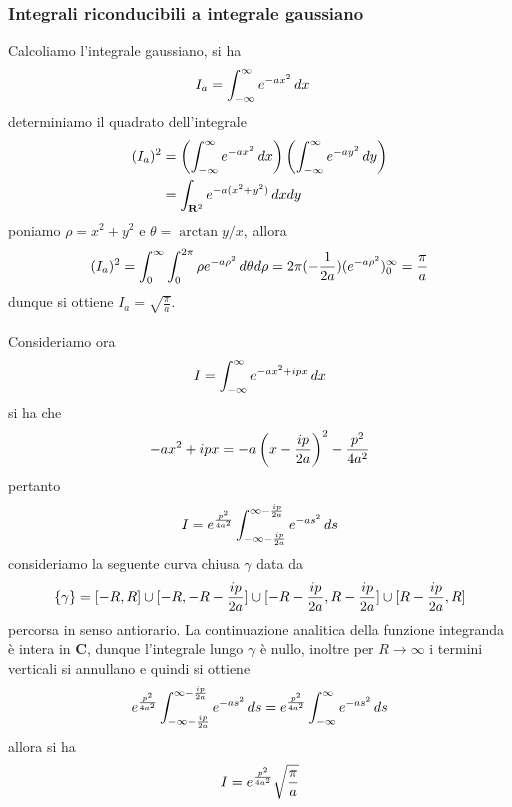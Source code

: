 \documentclass{article}
\begin{document}
\subsubsection{Integrali riconducibili a integrale gaussiano}
Calcoliamo l'integrale gaussiano, si ha
\begin{align}
    I_a &= \int_{-\infty}^\infty e^{-ax^2} \, dx \notag
\end{align}
determiniamo il quadrato dell'integrale
\begin{align}
    (I_a)^2 &= \left(\int_{-\infty}^\infty e^{-ax^2} \, dx\right)\left(\int_{-\infty}^\infty e^{-ay^2} \, dy\right) \notag \\
    &= \int_{\mathbf{R}^2} e^{-a(x^2 + y^2)} \, dxdy \notag
\end{align}
poniamo $\rho = x^2 + y^2$ e $\theta = \arctan y/x$, allora
\begin{gather}
    (I_a)^2 = \int_0^\infty\int_0^{2\pi} \rho e^{-a\rho^2} \, d\theta d\rho = 2\pi(-\frac{1}{2a})(e^{-a\rho^2})_0^\infty = \frac{\pi}{a} \notag
\end{gather}
dunque si ottiene $I_a = \sqrt{\frac{\pi}{a}}$. \\ \\
Consideriamo ora
\begin{gather}
    I = \int_{-\infty}^\infty e^{-ax^2 + ipx} \, dx \notag
\end{gather}
si ha che
\begin{gather}
    -ax^2 + ipx = -a\left(x - \frac{ip}{2a}\right)^2 - \frac{p^2}{4a^2} \notag
\end{gather}
pertanto
\begin{gather}
    I = e^{\frac{p^2}{4a^2}}\int_{-\infty - \frac{ip}{2a}}^{\infty - \frac{ip}{2a}} e^{-as^2} \, ds \notag
\end{gather}
consideriamo la seguente curva chiusa $\gamma$ data da
\begin{gather}
    \{\gamma\} = [-R, R] \cup [-R, -R - \frac{ip}{2a}] \cup [-R - \frac{ip}{2a}, R - \frac{ip}{2a}] \cup [R - \frac{ip}{2a}, R] \notag
\end{gather}
percorsa in senso antiorario. La continuazione analitica della funzione integranda è intera in $\mathbf{C}$, dunque l'integrale lungo $\gamma$ è nullo, inoltre per $R \rightarrow \infty$ i termini verticali si annullano e quindi si ottiene
\begin{gather}
    e^{\frac{p^2}{4a^2}}\int_{-\infty - \frac{ip}{2a}}^{\infty - \frac{ip}{2a}} e^{-as^2} \, ds = e^{\frac{p^2}{4a^2}}\int_{-\infty}^{\infty} e^{-as^2} \, ds \notag
\end{gather}
allora si ha
\begin{gather}
    I = e^{\frac{p^2}{4a^2}}\sqrt{\frac{\pi}{a}} \notag
\end{gather}
\end{document}
